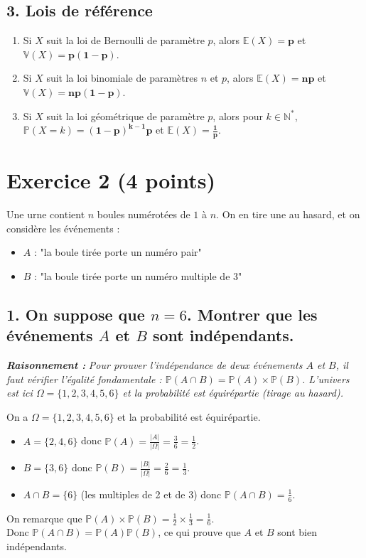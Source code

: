 \documentclass[11pt,a4paper]{article}
\newcommand{\explication}[1]{
    \vspace{0.2cm}
    \noindent\textcolor{blue!80!black}{
        \textbf{\textit{Raisonnement : }} \textit{#1}
    }
    \vspace{0.2cm}
}
\begin{document}
\subsection*{3. Lois de référence}
\begin{enumerate}
    \item[(a)] Si $X$ suit la loi de Bernoulli de paramètre $p$, alors $\mathbb{E}(X) = \mathbf{p}$ et $\mathbb{V}(X) = \mathbf{p(1-p)}$.
    \item[(b)] Si $X$ suit la loi binomiale de paramètres $n$ et $p$, alors $\mathbb{E}(X) = \mathbf{np}$ et $\mathbb{V}(X) = \mathbf{np(1-p)}$.
    \item[(c)] Si $X$ suit la loi géométrique de paramètre $p$, alors pour $k \in \mathbb{N}^*$, \\ $\mathbb{P}(X=k) = \mathbf{(1-p)^{k-1}p}$ et $\mathbb{E}(X) = \mathbf{\frac{1}{p}}$.
\end{enumerate}

\vspace{0.5cm}

\section*{Exercice 2 (4 points)}
Une urne contient $n$ boules numérotées de $1$ à $n$. On en tire une au hasard, et on considère les événements :
\begin{itemize}
    \item $A$ : "la boule tirée porte un numéro pair"
    \item $B$ : "la boule tirée porte un numéro multiple de 3"
\end{itemize}

\subsection*{1. On suppose que $n=6$. Montrer que les événements $A$ et $B$ sont indépendants.}

\explication{Pour prouver l'indépendance de deux événements $A$ et $B$, il faut vérifier l'égalité fondamentale : $\mathbb{P}(A \cap B) = \mathbb{P}(A) \times \mathbb{P}(B)$. L'univers est ici $\Omega = \{1, 2, 3, 4, 5, 6\}$ et la probabilité est équirépartie (tirage au hasard).}

On a $\Omega = \{1,2,3,4,5,6\}$ et la probabilité est équirépartie.
\begin{itemize}
    \item $A = \{2, 4, 6\}$ donc $\mathbb{P}(A) = \frac{|A|}{|\Omega|} = \frac{3}{6} = \frac{1}{2}$.
    \item $B = \{3, 6\}$ donc $\mathbb{P}(B) = \frac{|B|}{|\Omega|} = \frac{2}{6} = \frac{1}{3}$.
    \item $A \cap B = \{6\}$ (les multiples de 2 et de 3) donc $\mathbb{P}(A \cap B) = \frac{1}{6}$.
\end{itemize}
On remarque que $\mathbb{P}(A) \times \mathbb{P}(B) = \frac{1}{2} \times \frac{1}{3} = \frac{1}{6}$. \\
Donc $\mathbb{P}(A \cap B) = \mathbb{P}(A)\mathbb{P}(B)$, ce qui prouve que $A$ et $B$ sont bien indépendants.
\end{document}
